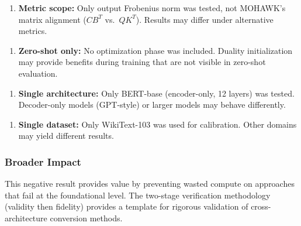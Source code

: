 \begin{enumerate}
\item \textbf{Metric scope:} Only output Frobenius norm was tested, not MOHAWK's matrix alignment ($CB^T$ vs.\ $QK^T$). Results may differ under alternative metrics.
\end{enumerate}

\begin{enumerate}
\item \textbf{Zero-shot only:} No optimization phase was included. Duality initialization may provide benefits during training that are not visible in zero-shot evaluation.
\end{enumerate}

\begin{enumerate}
\item \textbf{Single architecture:} Only BERT-base (encoder-only, 12 layers) was tested. Decoder-only models (GPT-style) or larger models may behave differently.
\end{enumerate}

\begin{enumerate}
\item \textbf{Single dataset:} Only WikiText-103 was used for calibration. Other domains may yield different results.
\end{enumerate}

\subsubsection{Broader Impact}

This negative result provides value by preventing wasted compute on approaches that fail at the foundational level. The two-stage verification methodology (validity then fidelity) provides a template for rigorous validation of cross-architecture conversion methods.
